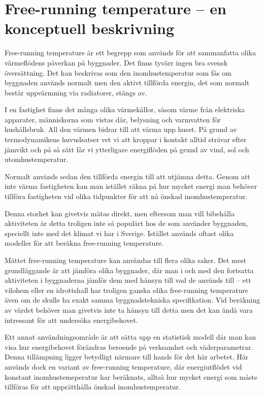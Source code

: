 \section{Free-running temperature – en konceptuell beskrivning}
\label{sec:freerunningtemp}

Free-running temperature är ett begrepp som används för att sammanfatta olika 
värmeflödens påverkan på byggnader. Det finns tyvärr ingen bra svensk översättning. Det kan beskrivas som den inomhustemperatur som fås om byggnaden används 
normalt men den aktivt tillförda energin, det som normalt består uppvärmning via radiatorer, stängs av.

I en fastighet finns det många olika värmekällor, såsom värme från elektriska apparater, 
människorna som vistas där, belysning och varmvatten för hushållsbruk. All den värmen
 bidrar till att värma upp huset. På grund av termodynamikens huvudsatser vet vi att 
 kroppar i kontakt alltid strävar efter jämvikt och på så sätt får vi ytterligare energiflöden på 
 grund av vind, sol och utomhustemperatur.

Normalt används sedan den tillförda energin till att utjämna detta. Genom att inte värma 
fastigheten kan man istället räkna på hur mycket energi man behöver tillföra fastigheten 
vid olika tidpunkter för att nå önskad inomhustemperatur.

Denna storhet kan givetvis mätas direkt, men eftersom man vill bibehålla aktiviteten är detta troligen inte så populärt hos de som använder byggnaden, speciellt inte med det klimat vi har i Sverige. Istället används oftast olika modeller för att beräkna free-running temperature.

Måttet free-running temperature kan användas till flera olika saker. Det mest grundläggande är att 
jämföra olika byggnader, där man i och med den fortsatta aktiviteten i byggnaderna jämför
 dem med hänsyn till vad de används till – ett vilohem eller en idrottshall har troligen 
 ganska olika free-running temperature även om de skulle ha exakt samma 
 byggnadstekniska specifikation. Vid beräkning av värdet behöver man givetvis inte ta 
 hänsyn till detta men det kan ändå vara intressant för att undersöka energibehovet.

Ett annat användningsområde är att sätta upp en statistisk modell där man kan visa hur 
energibehovet förändras beroende på verksamhet och väderparametrar. Denna tillämpning ligger betydligt närmare till hands för det här arbetet. Här används dock en variant av free-running temperature, där energiutflödet vid konstant inomhustemeperatur har beräknats, alltså hur mycket energi som måste tillföras för att upprätthålla önskad inomhustemperatur.
